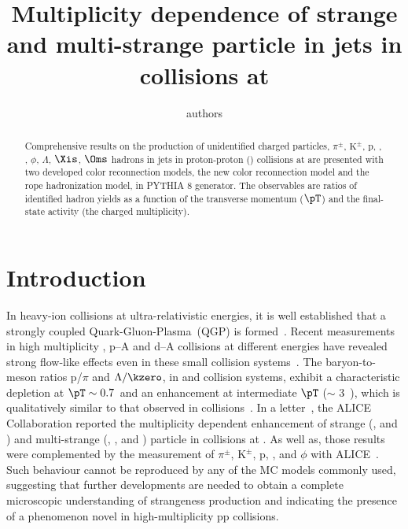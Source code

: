 \documentclass[ALICE,manyauthors]{StrinJet}
\begin{document}
\title{Multiplicity dependence of strange and multi-strange particle in jets in \pp collisions at \seven}
\author{authors}
\begin{abstract}
	\label{sec:Abs}
Comprehensive results on the production of unidentified charged particles, $\pi^{\pm}$, $\mathrm{K^{\pm}}$, p, \kzero, \kstar, $\phi$, $\Lambda$, $\Xis$, $\Oms$ hadrons in jets in proton-proton (\pp) collisions at \seven  are presented
with two developed color reconnection models, the new color reconnection model and the rope hadronization model, in PYTHIA 8 generator. The observables are ratios of identified hadron yields as a function of the transverse momentum ($\pT$) and the final-state activity (the charged multiplicity).


\end{abstract}


\setcounter{page}{1}


\section{Introduction}
\label{sec:intro}
In heavy-ion collisions at ultra-relativistic energies, it is well established that a strongly coupled Quark-Gluon-Plasma~(QGP) is formed~\cite{Adams:2005dq, Adcox:2004mh, Arsene:2004fa, Back:2004je, Schukraft:2011na}.
Recent measurements in high multiplicity \pp, p--A and d--A collisions at different energies have revealed strong flow-like effects even in these small collision systems~\cite{Abelev:2012sk, Chatrchyan:2013eya, Khachatryan:2010gv, CMS:2012qk, Abelev:2012ola, Aad:2012gla, Aad:2013fja, Chatrchyan:2013nka, Adare:2013esx, Adams:2006nd}.
The baryon-to-meson ratios p/$\pi$ and $\Lambda/\kzero$, in \pp and \pPb collision systems, exhibit a characteristic depletion at $\pT \sim 0.7$~\GeVc and an enhancement at intermediate $\pT$ ($\sim$ 3~\GeVc), which is qualitatively similar to that observed in \PbPb collisions~\cite{ALICE:2018pal}.
In a letter~\cite{ALICE:2016fzo}, the ALICE Collaboration reported the multiplicity dependent enhancement of strange (\kzero, \lmb and \almb) and multi-strange (\X, \Ix, \Om and \Mo) particle in \pp collisions at \seven. As well as, those results were complemented by the measurement of $\pi^{\pm}$, $\mathrm{K}^{\pm}$, p, \pbar, \kstar and $\phi$ with ALICE~\cite{ALICE:2018pal}.
Such behaviour cannot be reproduced by any of the MC models commonly used, suggesting that further developments are needed to obtain a complete microscopic understanding of strangeness production and indicating the presence of a phenomenon novel in high-multiplicity pp collisions.
\end{document}
